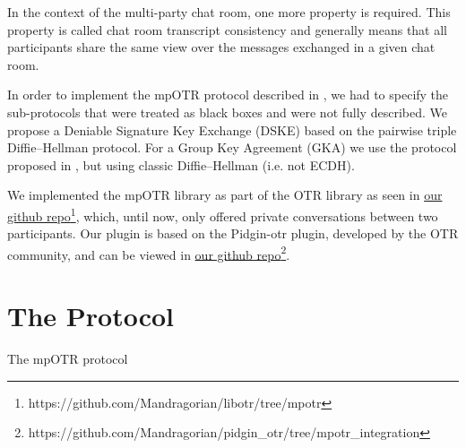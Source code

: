 \documentclass[]{article}
\begin{document}
In the context of the multi-party chat room, one more property is required.
This property is called chat room transcript consistency and generally means that all participants share the same view over the messages  exchanged in a given chat room.

In order to implement the mpOTR protocol described in \cite{mpotr}, we had to specify the sub-protocols that were treated as black boxes and were not fully described.
We propose a Deniable Signature Key Exchange (DSKE) based on the pairwise triple Diffie--Hellman \cite{website:openwhisper-tdh} protocol.
For a Group Key Agreement (GKA) we use the protocol proposed in \cite{mpenc}, but using classic Diffie--Hellman (i.e. not ECDH).

We implemented the mpOTR library as part of the OTR library as seen in \href{https://github.com/Mandragorian/libotr/tree/mpotr}{our github repo\footnote{https://github.com/Mandragorian/libotr/tree/mpotr}}, which, until now, only offered private conversations between two participants.
Our plugin is based on the Pidgin-otr plugin, developed by the OTR community, and can be viewed in \href{https://github.com/Mandragorian/pidgin_otr/tree/mpotr_integration}{our github repo\footnote{https://github.com/Mandragorian/pidgin\_otr/tree/mpotr\_integration}}.

\section{The Protocol}
\begin{algorithm}[h]
	\caption{The mpOTR protocol}
	\label{mpotr_algo}
\end{algorithm}
\end{document}
